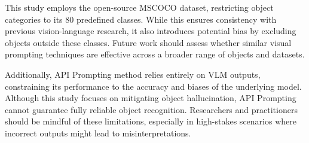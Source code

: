 This study employs the open-source MSCOCO dataset, restricting object categories to its 80 predefined classes. While this ensures consistency with previous vision-language research, it also introduces potential bias by excluding objects outside these classes. Future work should assess whether similar visual prompting techniques are effective across a broader range of objects and datasets.

Additionally, API Prompting method relies entirely on VLM outputs, constraining its performance to the accuracy and biases of the underlying model. Although this study focuses on mitigating object hallucination, API Prompting cannot guarantee fully reliable object recognition. Researchers and practitioners should be mindful of these limitations, especially in high-stakes scenarios where incorrect outputs might lead to misinterpretations.
